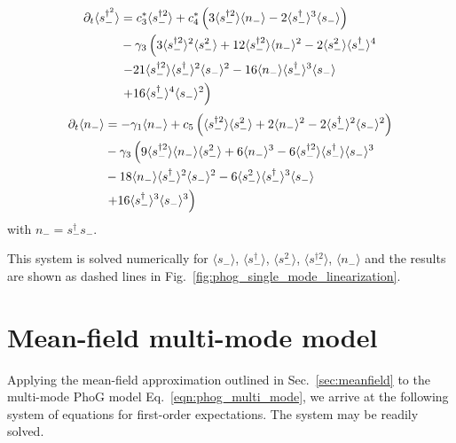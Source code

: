\begin{align}
%
%
\partial_t\langle s_-^{\dagger^2} \rangle &= c_3^* \langle s_-^{\dagger 2}\rangle + c_4^* \left(3 \langle s_-^{\dagger 2} \rangle \langle n_- \rangle - 2 \langle s_-^\dagger \rangle^3 \langle s_- \rangle \right) \notag \\
%
&- \gamma_3 \left(3 \langle s_-^{\dagger 2} \rangle^2 \langle s_-^2 \rangle + 12 \langle s_-^{\dagger 2} \rangle \langle n_- \rangle^2 - 2\langle s_-^2 \rangle \langle s_-^\dagger \rangle^4 \right. \notag \\
%
&\left. - 21 \langle s_-^{\dagger 2}\rangle \langle s_-^\dagger\rangle^2 \langle s_- \rangle^2 - 16 \langle n_- \rangle \langle s_-^\dagger \rangle^3 \langle s_-\rangle \right. \notag \\
%
& \left.+ 16 \langle s_-^\dagger\rangle^4 \langle s_- \rangle^2 \right)
\end{align}
\begin{align}\label{eqn:expectations_linear_last}
%
%
\partial_t \langle n_- \rangle &= - \gamma_1 \langle n_- \rangle + c_5 \left( \langle s_-^{\dagger 2} \rangle \langle s_-^2 \rangle + 2 \langle n_- \rangle^2 - 2 \langle s_-^\dagger \rangle^2 \langle s_- \rangle^2 \right) \notag \\
%
&- \gamma_3 \left( 9 \langle s_-^{\dagger 2} \rangle \langle n_-  \rangle \langle s_-^2\rangle + 6 \langle n_-\rangle^3  - 6 \langle s_-^{\dagger 2}\rangle \langle s_-^\dagger \rangle \langle s_- \rangle^3 \right. \notag \\
%
& - 18 \langle n_- \rangle \langle s_-^\dagger \rangle^2 \langle s_- \rangle^2 - 6 \langle s_-^2 \rangle \langle s_-^\dagger \rangle^3 \langle s_- \rangle \notag \\
%
& \left. + 16 \langle s_-^\dagger \rangle^3 \langle s_-\rangle^3 \right)
\end{align}
with $n_- = s_-^\dagger s_-$.

This system is solved numerically for $\langle s_- \rangle$, $\langle s_-^\dagger \rangle$, $\langle s_-^2\rangle$, $\langle s_-^{\dagger 2}\rangle$, $\langle n_-\rangle$ and the results are shown as dashed lines in Fig.~\ref{fig:phog_single_mode_linearization}.

\section{Mean-field multi-mode model}\label{appedix:mean_field}
Applying the mean-field approximation outlined in Sec.~\ref{sec:meanfield} to the multi-mode PhoG model Eq.~\ref{eqn:phog_multi_mode}, we arrive at the following system of equations for first-order expectations. The system may be readily solved.

